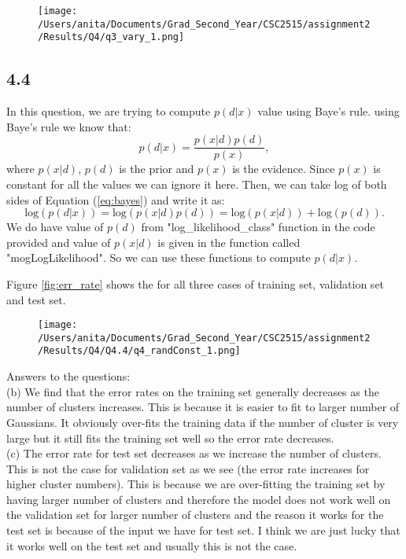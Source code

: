 \documentclass[10pt]{article}
\begin{document}
\begin{figure}[H]
	\centering
	\texttt{[image: /Users/anita/Documents/Grad\_Second\_Year/CSC2515/assignment2/Results/Q4/q3\_vary\_1.png]}
	\caption{}
	\label{fig:q4.3_mu}
\end{figure}

\subsection*{4.4}
In this question, we are trying to compute $p(d|x)$ value using Baye's rule. using Baye's rule we know that:
\begin{equation}\label{eq:bayes}
p(d|x) = \frac{p(x|d) p(d)}{p(x)},
\end{equation}
where $p(x|d)$, $p(d)$ is the prior and $p(x)$ is the evidence. Since $p(x)$ is constant for all the values we can ignore it here. Then, we can take log of both sides of Equation (\ref{eq:bayes}) and write it as:
\begin{equation}
\mathrm{log} (p(d|x)) = \mathrm{log}(p(x|d) p(d)) = \mathrm{log}(p(x|d)) + \mathrm{log}(p(d)).
\end{equation} 
We do have value of $p(d)$ from "log\_likelihood\_class" function in the code provided and value of $p(x|d)$ is given in the function called "mogLogLikelihood". So we can use these functions to compute $p(d|x)$.

Figure \ref{fig:err_rate} shows the for all three cases of training set, validation set and test set.
\begin{figure}[H]
	\centering
	\texttt{[image: /Users/anita/Documents/Grad\_Second\_Year/CSC2515/assignment2/Results/Q4/Q4.4/q4\_randConst\_1.png]}
	\caption{}
	\label{fig:4.4}
\end{figure}



Answers to the questions: \\

(b) We find that the error rates on the training set generally decreases as the number of clusters increases. This is because it is easier to fit to larger number of Gaussians. It obviously over-fits the training data if the number of cluster is very large but it still fits the training set well so the error rate decreases. \\

(c) The error rate for test set decreases as we increase the number of clusters. This is not the case for validation set as we see (the error rate increases for higher cluster numbers). This is because we are over-fitting the training set by having larger number of clusters and therefore the model does not work well on the validation set for larger number of clusters and the reason it works for the test set is because of the input we have for test set. I think we are just lucky that it works well on the test set and usually this is not the case.
\end{document}

